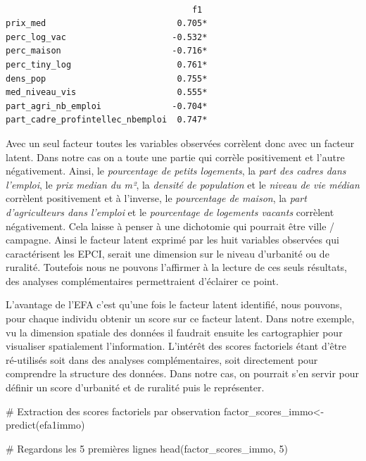\documentclass[
  french,
  11pt,
  a4paper,
]{article}
\newenvironment{Shaded}{}{}
\newcommand{\CommentTok}[1]{\textcolor[rgb]{0.42,0.45,0.49}{#1}}
\newcommand{\DecValTok}[1]{\textcolor[rgb]{0.00,0.36,0.77}{#1}}
\newcommand{\FunctionTok}[1]{\textcolor[rgb]{0.44,0.26,0.76}{#1}}
\newcommand{\NormalTok}[1]{\textcolor[rgb]{0.14,0.16,0.18}{#1}}
\newcommand{\OtherTok}[1]{\textcolor[rgb]{0.44,0.26,0.76}{#1}}
\begin{document}
\begin{verbatim}

                                     f1 
prix_med                          0.705*
perc_log_vac                     -0.532*
perc_maison                      -0.716*
perc_tiny_log                     0.761*
dens_pop                          0.755*
med_niveau_vis                    0.555*
part_agri_nb_emploi              -0.704*
part_cadre_profintellec_nbemploi  0.747*
\end{verbatim}

Avec un seul facteur toutes les variables observées corrèlent donc avec
un facteur latent. Dans notre cas on a toute une partie qui corrèle
positivement et l'autre négativement. Ainsi, le \emph{pourcentage de
petits logements}, la \emph{part des cadres dans l'emploi}, le
\emph{prix median du m²}, la \emph{densité de population} et le
\emph{niveau de vie médian} corrèlent positivement et à l'inverse, le
\emph{pourcentage de maison}, la \emph{part d'agriculteurs dans
l'emploi} et le \emph{pourcentage de logements vacants} corrèlent
négativement. Cela laisse à penser à une dichotomie qui pourrait être
ville / campagne. Ainsi le facteur latent exprimé par les huit variables
observées qui caractérisent les EPCI, serait une dimension sur le niveau
d'urbanité ou de ruralité. Toutefois nous ne pouvons l'affirmer à la
lecture de ces seuls résultats, des analyses complémentaires
permettraient d'éclairer ce point.

L'avantage de l'EFA c'est qu'une fois le facteur latent identifié, nous
pouvons, pour chaque individu obtenir un score sur ce facteur latent.
Dans notre exemple, vu la dimension spatiale des données il faudrait
ensuite les cartographier pour visualiser spatialement l'information.
L'intérêt des scores factoriels étant d'être ré-utilisés soit dans des
analyses complémentaires, soit directement pour comprendre la structure
des données. Dans notre cas, on pourrait s'en servir pour définir un
score d'urbanité et de ruralité puis le représenter.

\begin{Shaded}
\begin{Highlighting}[]
\CommentTok{\# Extraction des scores factoriels par observation}
\NormalTok{factor\_scores\_immo}\OtherTok{\textless{}{-}}\FunctionTok{predict}\NormalTok{(efa1immo)}

\CommentTok{\# Regardons  les 5 premières lignes}
\FunctionTok{head}\NormalTok{(factor\_scores\_immo, }\DecValTok{5}\NormalTok{)}
\end{Highlighting}
\end{Shaded}
\end{document}
